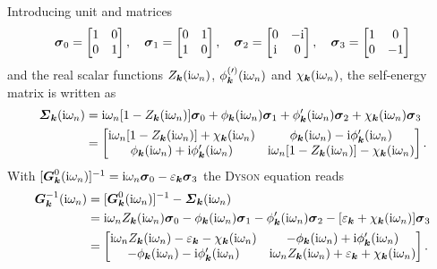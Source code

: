 Introducing unit and  matrices
%
\begin{equation*}
    \boldsymbol \sigma_0 =
    \begin{bmatrix}
        1 & 0 \\
        0 & 1
    \end{bmatrix},
    \quad
    \boldsymbol \sigma_1 =
    \begin{bmatrix}
        0 & 1 \\
        1 & 0
    \end{bmatrix},
    \quad
    \boldsymbol \sigma_2 =
    \begin{bmatrix}
        0 & -\mathrm i \\
        \mathrm i & 0
    \end{bmatrix},
    \quad
    \boldsymbol \sigma_3 =
    \begin{bmatrix}
    1 & 0 \\
    0 & -1
    \end{bmatrix}
\end{equation*}
%
and the real scalar functions $Z_{\boldsymbol k}(\mathrm i \omega_n)$, $\phi^{(\prime)}_{\boldsymbol
k}(\mathrm i \omega_n)$ and $\chi_{\boldsymbol k}(\mathrm i \omega_n)$, the self-energy matrix is
written as
%
\begin{align} \label{self-energy matrix}
    \boldsymbol {\varSigma}_{\boldsymbol k}(\mathrm i \omega_n) &= \mathrm i \omega_n
    [1 - Z_{\boldsymbol k}(\mathrm i \omega_n)] \boldsymbol \sigma_0
    + \phi _{\boldsymbol k}(\mathrm i \omega_n) \boldsymbol \sigma_1
    + \phi'_{\boldsymbol k}(\mathrm i \omega_n) \boldsymbol \sigma_2
    + \chi _{\boldsymbol k}(\mathrm i \omega_n) \boldsymbol \sigma_3
    \\ \notag
    &=
    \begin{bmatrix}
        \mathrm i \omega_n [1 - Z_{\boldsymbol k}(\mathrm i \omega_n)] + \chi_{\boldsymbol k}(\mathrm i \omega_n) &
        \phi_{\boldsymbol k}(\mathrm i \omega_n) - \mathrm i \phi'_{\boldsymbol k}(\mathrm i \omega_n) \\
        \phi_{\boldsymbol k}(\mathrm i \omega_n) + \mathrm i \phi'_{\boldsymbol k}(\mathrm i \omega_n) &
        \mathrm i \omega_n [1 - Z_{\boldsymbol k}(\mathrm i \omega_n)] - \chi_{\boldsymbol k}(\mathrm i \omega_n)
    \end{bmatrix}.
\end{align}
%
With $[\boldsymbol G^0_{\boldsymbol k}(\mathrm i \omega_n)]^{-1} = \mathrm i \omega_n \boldsymbol \sigma_0 -
\varepsilon_{\boldsymbol k} \boldsymbol \sigma_3$ the \textsc{Dyson} equation reads
%
\begin{align*}
    \boldsymbol G_{\boldsymbol k}^{-1}(\mathrm i \omega_n) &=
    [\boldsymbol G^0_{\boldsymbol k}(\mathrm i \omega_n)]^{-1} - \boldsymbol {\varSigma}_{\boldsymbol k}(\mathrm i \omega_n)
    \\
    &= \mathrm i \omega_n Z_{\boldsymbol k}(\mathrm i \omega_n) \boldsymbol \sigma_0
    - \phi _{\boldsymbol k}(\mathrm i \omega_n) \boldsymbol \sigma_1
    - \phi'_{\boldsymbol k}(\mathrm i \omega_n) \boldsymbol \sigma_2
    - [\varepsilon_{\boldsymbol k} + \chi_{\boldsymbol k}(\mathrm i \omega_n)] \boldsymbol \sigma_3 \\
    &= \begin{bmatrix}
        \mathrm i \omega_n Z_{\boldsymbol k}(\mathrm i \omega_n)
        - \varepsilon_{\boldsymbol k} - \chi_{\boldsymbol k}(\mathrm i \omega_n) &
        -\phi_{\boldsymbol k}(\mathrm i \omega_n) + \mathrm i \phi'_{\boldsymbol k}(\mathrm i \omega_n) \\
        -\phi_{\boldsymbol k}(\mathrm i \omega_n) - \mathrm i \phi'_{\boldsymbol k}(\mathrm i \omega_n) &
        \mathrm i \omega_n Z_{\boldsymbol k}(\mathrm i \omega_n)
        + \varepsilon_{\boldsymbol k} + \chi_{\boldsymbol k}(\mathrm i \omega_n)
    \end{bmatrix}.
\end{align*}
